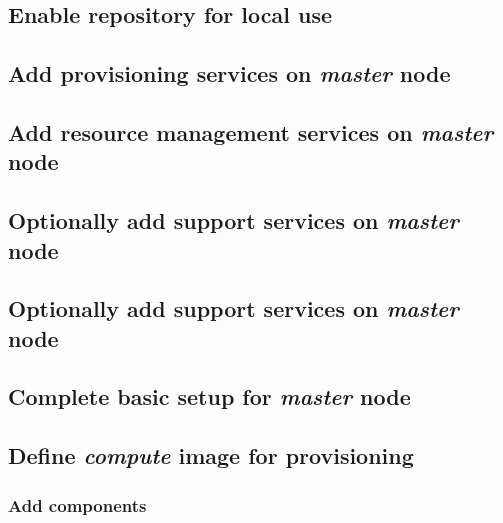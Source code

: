 \documentclass[letterpaper]{article}
\begin{document}
\subsection{Enable \xCAT{} repository for local use} \label{sec:enable_xcat}





\subsection{Add provisioning services on {\em master} node} \label{sec:add_provisioning}




\vspace*{0.15cm}
\subsection{Add resource management services on {\em master} node} \label{sec:add_rm}


\subsection{Optionally add \InfiniBand{} support services on {\em master} node} \label{sec:add_ofed}


\subsection{Optionally add \OmniPath{} support services on {\em master} node} \label{sec:add_opa}


\subsection{Complete basic \xCAT{} setup for {\em master} node} \label{sec:setup_xcat}


\subsection{Define {\em compute} image for provisioning}


\vspace*{0.2cm}
\subsubsection{Add \OHPC{} components} \label{sec:add_components}

\end{document}
